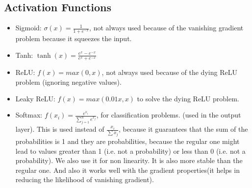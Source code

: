\documentclass{article}
\begin{document}
\subsection*{Activation Functions}
\begin{itemize}
  \item Sigmoid: \(\sigma(x) = \frac{1}{1+e^{-x}}\), not always used because of the vanishing gradient problem because it squeezes the input.
  \item Tanh: \(\tanh(x) = \frac{e^x - e^{-x}}{e^x + e^{-x}}\)
  \item ReLU: \(f(x) = max(0,x)\), not always used because of the dying ReLU problem (ignoring negative values).
  \item Leaky ReLU: \(f(x) = max(0.01x,x)\) to solve the dying ReLU problem.
  \item Softmax: \(f(x_i) = \frac{e^{x_i}}{\sum_{j=1}^{n}e^{x_j}}\), for classification problems. (used in the output layer). This is used instead of \(\frac{x_i}{\sum x_j}\), because it guarantees that the sum of the probabilities is 1 and they are probabilities, because the regular one might lead to values greater than 1 (i.e. not a probability) or less than 0 (i.e. not a probability). We also use it for non linearity. It is also more stable than the regular one. And also it works well with the gradient properties(it helps in reducing the likelihood of vanishing gradient). 
  
\end{itemize}
\end{document}
